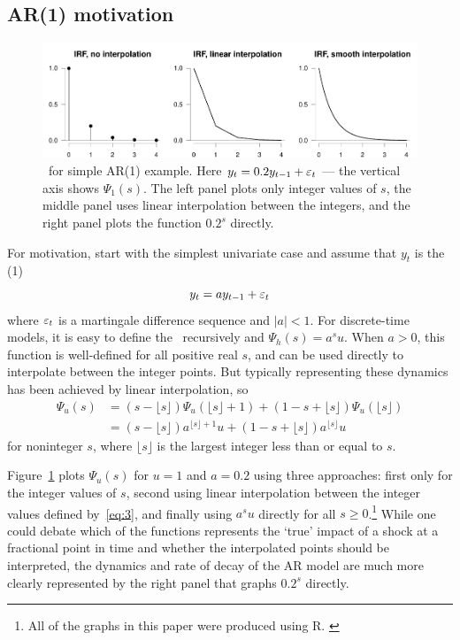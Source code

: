 \documentclass[12pt,fleqn]{article}
\begin{document}
\subsection{AR(1) motivation}
\label{S2.1}

\begin{figure}[t]
  \centering
  \includegraphics{graphs/motivation.pdf}
  \caption{\IRF\ for simple AR(1) example. Here $y_t = 0.2 y_{t-1} +
    \varepsilon_t$ --- the vertical axis shows $\Psi_1(s)$. The left panel
    plots only integer values of $s$, the middle panel uses linear
    interpolation between the integers, and the right panel plots the
    function $0.2^s$ directly.}
  \label{fig:1}
\end{figure}

For motivation, start with the simplest univariate case and assume
that $y_t$ is the \AR(1)
\begin{equation}
  \label{eq:1}
  y_t = a y_{t-1} + \varepsilon_t
\end{equation}
where $\varepsilon_t$ is a martingale difference sequence and
$\lvert a \rvert < 1$.  For discrete-time models, it is easy to define
the \IRF\ recursively and $\Psi_h(s) = a^s u$. When $a > 0$, this
function is well-defined for all positive real $s$, and can be used
directly to interpolate between the integer points. But typically
representing these dynamics has been achieved by linear interpolation,
so
\begin{align}
  \label{eq:2}
  \Psi_u(s)
  &= (s - \lfloor s\rfloor) \Psi_u(\lfloor s\rfloor+1)
    + (1 - s + \lfloor s\rfloor) \Psi_u(\lfloor s\rfloor) \\
  \label{eq:3}
  &= (s - \lfloor s\rfloor) a^{\lfloor s \rfloor + 1} u
    + (1 - s + \lfloor s\rfloor) a^{\lfloor s \rfloor} u
\end{align}
for noninteger $s$, where $\lfloor s\rfloor$ is the largest integer
less than or equal to $s$.

Figure~\ref{fig:1} plots $\Psi_u(s)$ for $u = 1$ and $a = 0.2$ using
three approaches: first only for the integer values of $s$, second
using linear interpolation between the integer values defined
by~\eqref{eq:3}, and finally using $a^s u$ directly for all
$s \geq 0$.\footnote{%
  All of the graphs in this paper were produced using R. \citep{R}} %
While one could debate which of the functions represents the `true'
impact of a shock at a fractional point in time and whether the
interpolated points should be interpreted, the dynamics and rate of
decay of the AR model are much more clearly represented by the right
panel that graphs $0.2^s$ directly.
\end{document}
